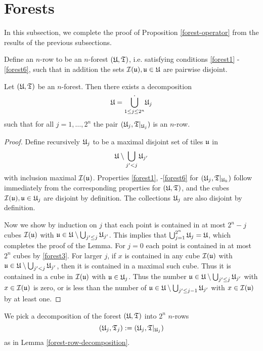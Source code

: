 {\section{Forests}
In this subsection, we complete the proof of Proposition \ref{forest-operator} from the results of the previous subsections.

Define an $n$-row to be an $n$-forest $({\mathfrak U}, {\mathfrak T})$, i.e. satisfying conditions \eqref{forest1} - \eqref{forest6}, such that in addition the sets ${\mathcal{I}}({\mathfrak u}), {\mathfrak u} \in {\mathfrak U}$ are pairwise disjoint.

\begin{lemma}
    \label{forest-row-decomposition}
    Let $({\mathfrak U}, {\mathfrak T})$ be an $n$-forest. Then there exists a decomposition
    $$
        {\mathfrak U} = \dot{\bigcup_{1 \le j \le 2^n}} {\mathfrak U}_j
    $$
    such that for all $j = 1, \dotsc, 2^n$ the pair $({\mathfrak U}_j, {\mathfrak T}|_{{\mathfrak U}_j})$ is an $n$-row.
\end{lemma}

\begin{proof}
    Define recursively ${\mathfrak U}_j$ to be a maximal disjoint set of tiles ${\mathfrak u}$ in
    $$
        {\mathfrak U} \setminus \bigcup_{j' < j} {\mathfrak U}_{j'}
    $$
    with inclusion maximal ${\mathcal{I}}({\mathfrak u})$. Properties \eqref{forest1}, -\eqref{forest6} for $({\mathfrak U}_j, {\mathfrak T}|_{{\mathfrak U}_k})$ follow immediately from the corresponding properties for $({\mathfrak U}, {\mathfrak T})$, and the cubes ${\mathcal{I}}({\mathfrak u}), {\mathfrak u} \in {\mathfrak U}_j$ are disjoint by definition. The collections ${\mathfrak U}_j$ are also disjoint by definition.

    Now we show by induction on $j$ that each point is contained in at most $2^n - j$ cubes ${\mathcal{I}}({\mathfrak u})$ with ${\mathfrak u} \in {\mathfrak U} \setminus \bigcup_{j' \le j} {\mathfrak U}_{j'}$. This implies that $\bigcup_{j = 1}^{2^n} {\mathfrak U}_j = {\mathfrak U}$, which completes the proof of the Lemma. For $j = 0$ each point is contained in at most $2^n$ cubes by \eqref{forest3}. For larger $j$, if $x$ is contained in any cube ${\mathcal{I}}({\mathfrak u})$ with ${\mathfrak u} \in {\mathfrak U} \setminus \bigcup_{j' < j} {\mathfrak U}_{j'}$, then it is contained in a maximal such cube. Thus it is contained in a cube in ${\mathcal{I}}({\mathfrak u})$ with ${\mathfrak u} \in {\mathfrak U}_j$. Thus the number ${\mathfrak u} \in {\mathfrak U} \setminus \bigcup_{j' \le j} {\mathfrak U}_{j'}$ with $x\in {\mathcal{I}}({\mathfrak u})$ is zero, or is less than the number of ${\mathfrak u} \in {\mathfrak U} \setminus \bigcup_{j' \le j-1} {\mathfrak U}_{j'}$ with $x \in {\mathcal{I}}({\mathfrak u})$ by at least one.
\end{proof}

We pick a decomposition of the forest $({\mathfrak U}, {\mathfrak T})$ into $2^n$ $n$-rows
\begin{equation*}
({\mathfrak U}_j, {\mathfrak T}_j) := ({\mathfrak U}_j, {\mathfrak T}|_{{\mathfrak U}_j})
\end{equation*}
as in Lemma \ref{forest-row-decomposition}.

}
